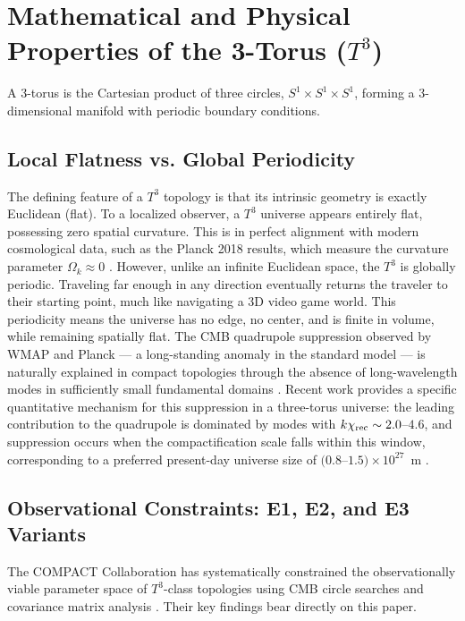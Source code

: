 \documentclass[aps,prd,11pt,onecolumn,superscriptaddress,nofootinbib,floatfix]{revtex4-2}
\begin{document}
\section{Mathematical and Physical Properties of the 3-Torus ($T^3$)}
\label{sec:t3-properties}

A 3-torus is the Cartesian product of three circles, $S^1 \times S^1 \times S^1$, forming a 3-dimensional manifold with periodic boundary conditions.

\subsection{Local Flatness vs. Global Periodicity}
The defining feature of a $T^3$ topology is that its intrinsic geometry is exactly Euclidean (flat). To a localized observer, a $T^3$ universe appears entirely flat, possessing zero spatial curvature. This is in perfect alignment with modern cosmological data, such as the Planck 2018 results, which measure the curvature parameter $\Omega_k \approx 0$ \cite{planck_2018}. However, unlike an infinite Euclidean space, the $T^3$ is globally periodic. Traveling far enough in any direction eventually returns the traveler to their starting point, much like navigating a 3D video game world. This periodicity means the universe has no edge, no center, and is finite in volume, while remaining spatially flat. The CMB quadrupole suppression observed by WMAP and Planck --- a long-standing anomaly in the standard model --- is naturally explained in compact topologies through the absence of long-wavelength modes in sufficiently small fundamental domains \cite{compact_eigenmodes}. Recent work provides a specific quantitative mechanism for this suppression in a three-torus universe: the leading contribution to the quadrupole is dominated by modes with $k\chi_{\rm rec} \sim 2.0$--$4.6$, and suppression occurs when the compactification scale falls within this window, corresponding to a preferred present-day universe size of $(0.8$--$1.5)\times10^{27}$~m \cite{fornal_2026}.

\subsection{Observational Constraints: E1, E2, and E3 Variants}

The COMPACT Collaboration has systematically constrained the observationally viable parameter space of $T^3$-class topologies using CMB circle searches and covariance matrix analysis \cite{compact_pt1, compact_eigenmodes}. Their key findings bear directly on this paper.
\end{document}
